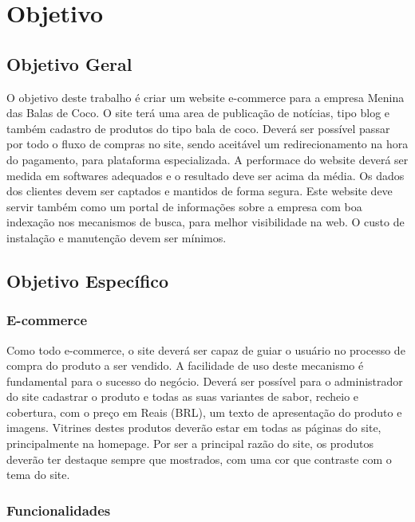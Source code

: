 \chapter{Objetivo}

\section{Objetivo Geral}

O objetivo deste trabalho é criar um website e-commerce para a empresa Menina das Balas de Coco. O site terá uma area de publicação de notícias, tipo blog e também cadastro de produtos do tipo bala de coco. Deverá ser possível passar por todo o fluxo de compras no site, sendo aceitável um redirecionamento na hora do pagamento, para plataforma especializada. A performace do website deverá ser medida em softwares adequados e o resultado deve ser acima da média. Os dados dos clientes devem ser captados e mantidos de forma segura. Este website deve servir também como um portal de informações sobre a empresa com boa indexação nos mecanismos de busca, para melhor visibilidade na web. O custo de instalação e manutenção devem ser mínimos.

\section{Objetivo Específico}

\subsection{E-commerce}

Como todo e-commerce, o site deverá ser capaz de guiar o usuário no processo de compra do produto a ser vendido. A facilidade de uso deste mecanismo é fundamental para o sucesso do negócio. Deverá ser possível para o administrador do site cadastrar o produto e todas as suas variantes de sabor, recheio e cobertura, com o preço em Reais (BRL), um texto de apresentação do produto e imagens. Vitrines destes produtos deverão estar em todas as páginas do site, principalmente na homepage. Por ser a principal razão do site, os produtos deverão ter destaque sempre que mostrados, com uma cor que contraste com o tema do site.

\subsection{Funcionalidades}


